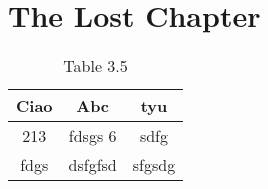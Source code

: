 \chapter{The Lost Chapter}

\begin{table}[h!]
	\centering
	\begin{tabular}{ccc}
		\toprule
		Ciao & Abc & tyu \\
		\midrule
		213 & fdsgs 6 & sdfg \\
		fdgs & dsfgfsd & sfgsdg \\
		\bottomrule
	\end{tabular}
\caption{Table 3.5}

\end{table}


\lipsum[1-3]